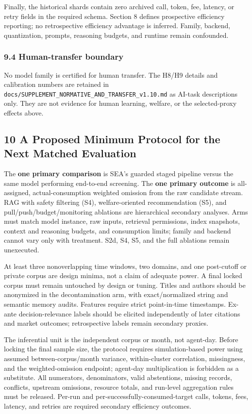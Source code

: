 \documentclass[
  11pt]{article}
\begin{document}
Finally, the historical shards contain zero archived call, token, fee,
latency, or retry fields in the required schema. Section 8 defines
prospective efficiency reporting; no retrospective efficiency advantage
is inferred. Family, backend, quantization, prompts, reasoning budgets,
and runtime remain confounded.

\subsubsection{9.4 Human-transfer
boundary}\label{human-transfer-boundary}

No model family is certified for human transfer. The H8/H9 details and
calibration numbers are retained in
\texttt{docs/SUPPLEMENT\_NORMATIVE\_AND\_TRANSFER\_v1.10.md} as AI-task
descriptions only. They are not evidence for human learning, welfare, or
the selected-proxy effects above.

\subsection{10 A Proposed Minimum Protocol for the Next Matched
Evaluation}\label{a-proposed-minimum-protocol-for-the-next-matched-evaluation}

The \textbf{one primary comparison} is SEA's guarded staged pipeline
versus the same model performing end-to-end screening. The \textbf{one
primary outcome} is all-assigned, actual-consumption weighted omission
from the raw candidate stream. RAG with safety filtering (S4),
welfare-oriented recommendation (S5), and pull/push/budget/monitoring
ablations are hierarchical secondary analyses. Arms must match model
instance, raw inputs, retrieval permissions, index snapshots, context
and reasoning budgets, and consumption limits; family and backend cannot
vary only with treatment. S2d, S4, S5, and the full ablations remain
unexecuted.

At least three nonoverlapping time windows, two domains, and one
post-cutoff or private corpus are design minima, not a claim of adequate
power. A final locked corpus must remain untouched by design or tuning.
Titles and authors should be anonymized in the decontamination arm, with
exact/normalized string and semantic memory audits. Features require
strict point-in-time timestamps. Ex-ante decision-relevance labels
should be elicited independently of later citations and market outcomes;
retrospective labels remain secondary proxies.

The inferential unit is the independent corpus or month, not agent-day.
Before locking the final sample size, the protocol requires
simulation-based power using assumed between-corpus/month variance,
within-cluster correlation, missingness, and the weighted-omission
endpoint; agent-day multiplication is forbidden as a substitute. All
numerators, denominators, valid abstentions, missing records, conflicts,
upstream omissions, resource totals, and run-level aggregation rules
must be released. Per-run and per-successfully-consumed-target calls,
tokens, fees, latency, and retries are required secondary efficiency
outcomes.
\end{document}
